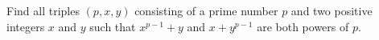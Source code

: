 Find all triples 
$(p, x, y)$
 consisting of a prime number 
$p$
 and two positive integers 
$x$
 and 
$y$
 such that 
$x^{p -1} + y$
 and 
$x + y^ {p -1}$
 are both powers of 
$p$.
